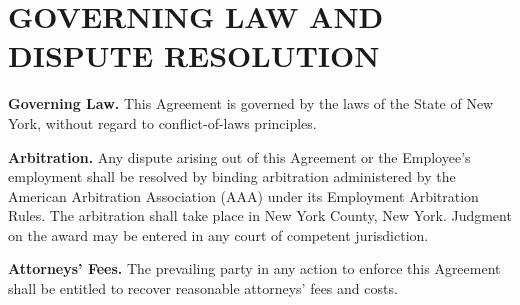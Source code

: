 \section{GOVERNING LAW AND DISPUTE RESOLUTION}

\parsp
\textbf{Governing Law.} This Agreement is governed by the laws of the State of New York, without regard to conflict-of-laws principles.

\parsp
\textbf{Arbitration.} Any dispute arising out of this Agreement or the Employee's employment shall be resolved by binding arbitration administered by the American Arbitration Association (AAA) under its Employment Arbitration Rules. The arbitration shall take place in New York County, New York. Judgment on the award may be entered in any court of competent jurisdiction.

\parsp
\textbf{Attorneys' Fees.} The prevailing party in any action to enforce this Agreement shall be entitled to recover reasonable attorneys' fees and costs.

